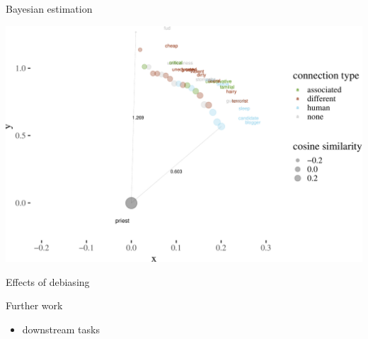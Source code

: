 \documentclass[10pt,ignorenonframetext,x11names, dvipsnames, bibspacing,natbib]{beamer}
\providecommand{\tightlist}{%
  \setlength{\itemsep}{0pt}\setlength{\parskip}{0pt}}
\begin{document}
\begin{frame}{Bayesian estimation}

\begin{center}\includegraphics[width=1.05\linewidth]{presentationESSLLI_files/figure-beamer/unnamed-chunk-3-1} \end{center}

\end{frame}

\begin{frame}{Effects of debiasing}

\begin{block}{Further work}

\begin{itemize}
\tightlist
\item
  downstream tasks
\end{itemize}

\end{block}

\end{frame}
\end{document}
